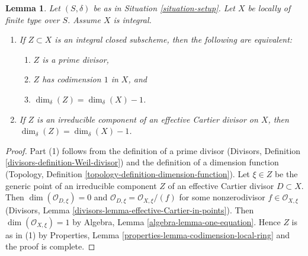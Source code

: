 \documentclass[10pt,a4paper]{amsart}
\theoremstyle{plain}
\newtheorem{lemma}[subsection]{Lemma}
\theoremstyle{definition}
\theoremstyle{remark}
\numberwithin{equation}{subsection}
\begin{document}
\begin{lemma}
\label{lemma-divisor-delta-dimension}
Let $(S, \delta)$ be as in Situation \ref{situation-setup}.
Let $X$ be locally of finite type over $S$. Assume $X$ is
integral.
\begin{enumerate}
\item If $Z \subset X$ is an integral closed subscheme, then
the following are equivalent:
\begin{enumerate}
\item $Z$ is a prime divisor,
\item $Z$ has codimension $1$ in $X$, and
\item $\dim_\delta(Z) = \dim_\delta(X) - 1$.
\end{enumerate}
\item If $Z$ is an irreducible component of an effective Cartier
divisor on $X$, then $\dim_\delta(Z) = \dim_\delta(X) - 1$.
\end{enumerate}
\end{lemma}

\begin{proof}
Part (1) follows from the definition of a prime divisor
(Divisors, Definition \ref{divisors-definition-Weil-divisor})
and the definition of a dimension function
(Topology, Definition \ref{topology-definition-dimension-function}).
Let $\xi \in Z$ be the generic point of an irreducible component $Z$ of
an effective Cartier divisor $D \subset X$.
Then $\dim(\mathcal{O}_{D, \xi}) = 0$ and
$\mathcal{O}_{D, \xi} = \mathcal{O}_{X, \xi}/(f)$ for some
nonzerodivisor $f \in \mathcal{O}_{X, \xi}$ (Divisors,
Lemma \ref{divisors-lemma-effective-Cartier-in-points}).
Then $\dim(\mathcal{O}_{X, \xi}) = 1$ by
Algebra, Lemma \ref{algebra-lemma-one-equation}. Hence $Z$ is as in (1) by
Properties, Lemma \ref{properties-lemma-codimension-local-ring}
and the proof is complete.
\end{proof}
\end{document}
